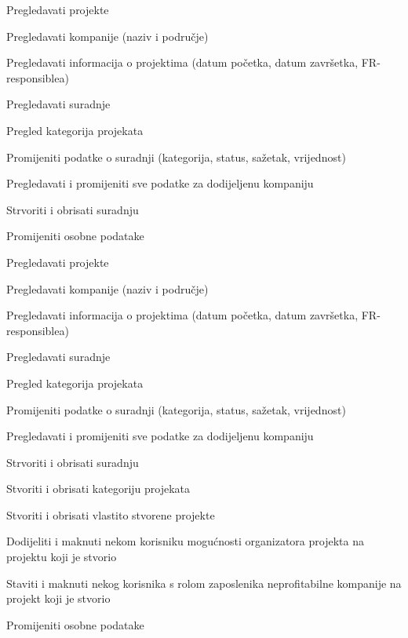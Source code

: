 \begin{packed_enum}
\begin{packed_enum}
				\end{packed_enum}

				\item  {}

				\begin{packed_enum}

					\item Pregledavati projekte
					\item Pregledavati kompanije (naziv i područje)
					\item Pregledavati informacija o projektima (datum početka, datum završetka, FR-responsiblea)
					\item Pregledavati suradnje
					\item Pregled kategorija projekata
					\item Promijeniti podatke o suradnji (kategorija, status, sažetak, vrijednost)
					\item Pregledavati i promijeniti sve podatke za dodijeljenu kompaniju
					\item Strvoriti i obrisati suradnju
					\item Promijeniti osobne podatake

				\end{packed_enum}

				\item  {}

				\begin{packed_enum}

					\item Pregledavati projekte
					\item Pregledavati kompanije (naziv i područje)
					\item Pregledavati informacija o projektima (datum početka, datum završetka, FR-responsiblea)
					\item Pregledavati suradnje
					\item Pregled kategorija projekata
					\item Promijeniti podatke o suradnji (kategorija, status, sažetak, vrijednost)
					\item Pregledavati i promijeniti sve podatke za dodijeljenu kompaniju
					\item Strvoriti i obrisati suradnju
					\item Stvoriti i obrisati kategoriju projekata
					\item Stvoriti i obrisati vlastito stvorene projekte
					\item Dodijeliti i maknuti nekom korisniku mogućnosti organizatora projekta na projektu koji je stvorio
					\item Staviti i maknuti nekog korisnika s rolom zaposlenika neprofitabilne kompanije na projekt koji je stvorio
					\item Promijeniti osobne podatake


\end{packed_enum}
\end{packed_enum}
